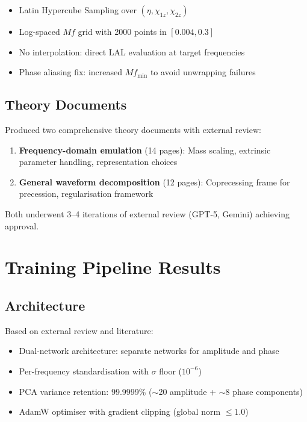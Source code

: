 \documentclass[11pt,a4paper]{article}
\begin{document}
\begin{itemize}
    \item Latin Hypercube Sampling over $(\eta, \chi_{1z}, \chi_{2z})$
    \item Log-spaced $Mf$ grid with 2000 points in $[0.004, 0.3]$
    \item No interpolation: direct LAL evaluation at target frequencies
    \item Phase aliasing fix: increased $Mf_\text{min}$ to avoid unwrapping failures
\end{itemize}

\subsection{Theory Documents}

Produced two comprehensive theory documents with external review:
\begin{enumerate}
    \item \textbf{Frequency-domain emulation} (14 pages): Mass scaling, extrinsic parameter handling, representation choices
    \item \textbf{General waveform decomposition} (12 pages): Coprecessing frame for precession, regularisation framework
\end{enumerate}

Both underwent 3--4 iterations of external review (GPT-5, Gemini) achieving approval.

\section{Training Pipeline Results}

\subsection{Architecture}

Based on external review and literature:
\begin{itemize}
    \item Dual-network architecture: separate networks for amplitude and phase
    \item Per-frequency standardisation with $\sigma$ floor ($10^{-6}$)
    \item PCA variance retention: 99.9999\% ($\sim$20 amplitude + $\sim$8 phase components)
    \item AdamW optimiser with gradient clipping (global norm $\leq 1.0$)
\end{itemize}
\end{document}
